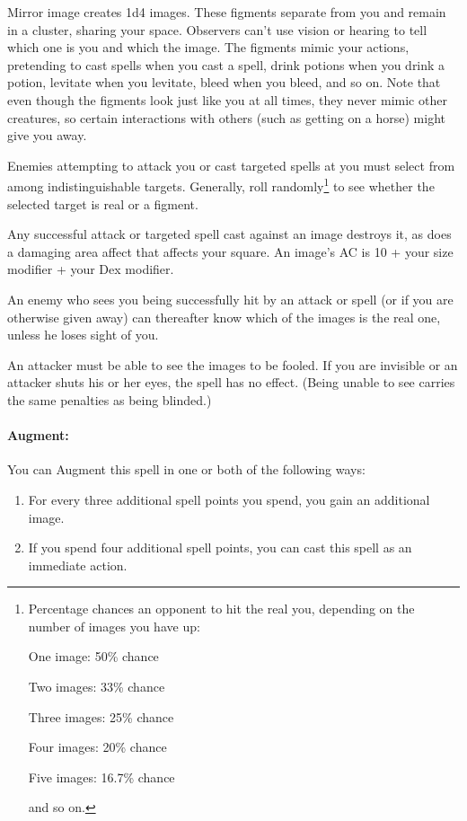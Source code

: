 Mirror image creates 1d4 images. %
These figments separate from you and remain in a cluster, sharing your space. 
Observers can't use vision or hearing to tell which one is you and which the image.
The figments mimic your actions, pretending to cast spells when you cast a spell, drink potions when you drink a potion, levitate when you levitate, bleed when you bleed, and so on.
Note that even though the figments look just like you at all times, they never mimic other creatures, so certain interactions with others (such as getting on a horse) might give you away.

Enemies attempting to attack you or cast targeted spells at you must select from among indistinguishable targets. 
Generally, roll randomly\footnote{Percentage chances an opponent to hit the real you, depending on the number of images you have up:
\begin{list}{}{\leftmargin=1em}
 \item One image: 50\% chance
 \item Two images: 33\% chance
 \item Three images: 25\% chance
 \item Four images: 20\% chance
 \item Five images: 16.7\% chance
\end{list}
and so on.} to see whether the selected target is real or a figment.

Any successful attack or targeted spell cast against an image destroys it, as does a damaging area affect that affects your square. 
An image's AC is 10 + your size modifier + your Dex modifier.

An enemy who sees you being successfully hit by an attack or spell (or if you are otherwise given away) can thereafter know which of the images is the real one, unless he loses sight of you.

An attacker must be able to see the images to be fooled. If you are invisible or an attacker shuts his or her eyes, the spell has no effect. (Being unable to see carries the same penalties as being blinded.)

\paragraph{Augment:} You can Augment this spell in one or both of the following ways:
\begin{enumerate}
 \item For every three additional spell points you spend, you gain an additional image.
 \item If you spend four additional spell points, you can cast this spell as an immediate action.
\end{enumerate}
